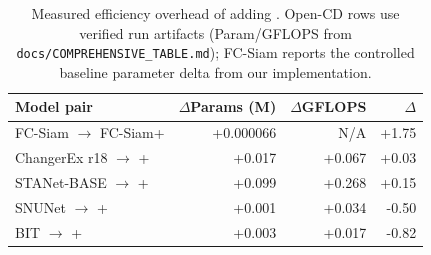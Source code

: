 \begin{table}[t]
  \centering
  \caption{Measured efficiency overhead of adding \cosa{}. Open-CD rows use verified run artifacts (Param/GFLOPS from \texttt{docs/COMPREHENSIVE\_TABLE.md}); FC-Siam reports the controlled baseline parameter delta from our implementation.}
  \label{tab:efficiency_overhead}
  \setlength{\tabcolsep}{4pt}
  \renewcommand{\arraystretch}{1.05}
  \scriptsize
  \begin{tabular}{l r r r}
    \toprule
    Model pair & $\Delta$Params (M) & $\Delta$GFLOPS & $\Delta$\Fonec{} \\
    \midrule
    FC-Siam $\rightarrow$ FC-Siam+\cosa{} & +0.000066 & N/A & +1.75 \\
    ChangerEx r18 $\rightarrow$ +\cosa{} & +0.017 & +0.067 & +0.03 \\
    STANet-BASE $\rightarrow$ +\cosa{} & +0.099 & +0.268 & +0.15 \\
    SNUNet $\rightarrow$ +\cosa{} & +0.001 & +0.034 & -0.50 \\
    BIT $\rightarrow$ +\cosa{} & +0.003 & +0.017 & -0.82 \\
    \bottomrule
  \end{tabular}
\end{table}
